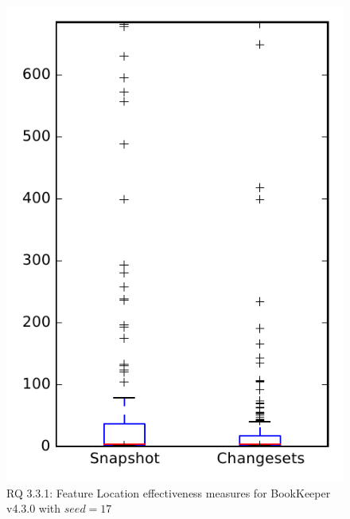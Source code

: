 
\begin{figure}
\centering
\includegraphics[height=0.4\textheight]{figures/flt_seed/rq1_bookkeeper_17}
\caption{RQ 3.3.1: Feature Location effectiveness measures for BookKeeper v4.3.0 with $seed=17$}
\label{fig:flt_seed:rq1:bookkeeper}
\end{figure}
